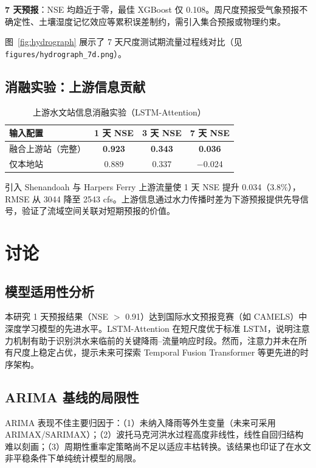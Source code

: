 \documentclass[12pt,a4paper]{article}
\begin{document}
\textbf{7 天预报}：NSE 均趋近于零，最佳 XGBoost 仅 0.108。周尺度预报受气象预报不确定性、土壤湿度记忆效应等累积误差制约，需引入集合预报或物理约束。

图~\ref{fig:hydrograph} 展示了 7 天尺度测试期流量过程线对比（见 \texttt{figures/hydrograph\_7d.png}）。

\subsection{消融实验：上游信息贡献}

\begin{table}[htbp]
\centering
\caption{上游水文站信息消融实验（LSTM-Attention）}
\label{tab:ablation}
\begin{tabular}{lccc}
\toprule
输入配置 & 1 天 NSE & 3 天 NSE & 7 天 NSE \\
\midrule
融合上游站（完整） & \textbf{0.923} & \textbf{0.343} & \textbf{0.036} \\
仅本地站         & 0.889 & 0.337 & $-$0.024 \\
\bottomrule
\end{tabular}
\end{table}

引入 Shenandoah 与 Harpers Ferry 上游流量使 1 天 NSE 提升 0.034（3.8\%），RMSE 从 3044 降至 2543 cfs。上游信息通过水力传播时差为下游预报提供先导信号，验证了流域空间关联对短期预报的价值。

\section{讨论}

\subsection{模型适用性分析}

本研究 1 天预报结果（NSE $>$ 0.91）达到国际水文预报竞赛（如 CAMELS）中深度学习模型的先进水平\cite{kratzert2019}。LSTM-Attention 在短尺度优于标准 LSTM，说明注意力机制有助于识别洪水来临前的关键降雨--流量响应时段。然而，注意力并未在所有尺度上稳定占优，提示未来可探索 Temporal Fusion Transformer 等更先进的时序架构\cite{lim2021}。

\subsection{ARIMA 基线的局限性}

ARIMA 表现不佳主要归因于：（1）未纳入降雨等外生变量（未来可采用 ARIMAX/SARIMAX）；（2）波托马克河洪水过程高度非线性，线性自回归结构难以刻画；（3）周期性重率定策略尚不足以适应丰枯转换。该结果也印证了在水文非平稳条件下单纯统计模型的局限\cite{milner2020}。
\end{document}
